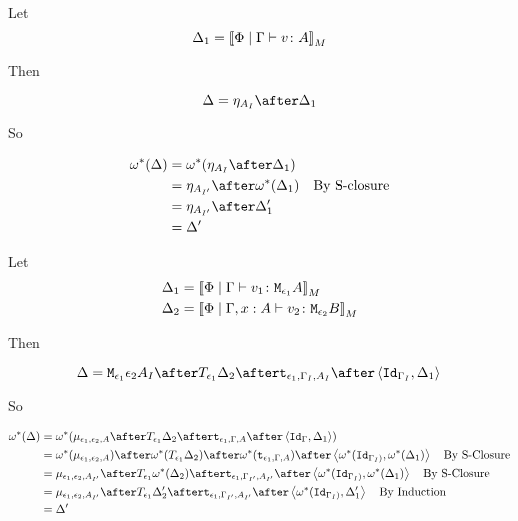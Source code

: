 \documentclass{report}
\begin{document}
Let \begin{equation}
    \Delta_1 = {\bf [\![}\Phi\mid\Gamma \vdash v \colon A{\bf ]\!]}_M
\end{equation}

Then

\begin{equation}
    \D = \point{A_I}\after \D_1\\
\end{equation}

So

\begin{align}
    \w\star(\D) &= \w\star(\point{A_I}\after \D_1)\\
            & = \point{A_{I'}} \after\w\star(\D_1)\qt{By S-closure}\\
            & = \point{A_{I'}} \after\D_1'\\
            & = \D'
\end{align}

Let \begin{align}
    \Delta_1 &= {\bf [\![}\Phi\mid\Gamma \vdash v_1 \colon \texttt{M}_{\epsilon_1}{A}{\bf ]\!]}_M\\
    \Delta_2 &= {\bf [\![}\Phi\mid\Gamma, x: A \vdash v_2 \colon \texttt{M}_{\epsilon_2}{B}{\bf ]\!]}_M
\end{align}

Then

\begin{equation}
    \D = \M{\e_1}{\e_2}{A_I}\after\T{\e_1}{\D_2}\after\tstrength{\e_1}{\G_I}{A_I}\after\pr{\Id{\G_{I}}}{\D_1}\\
\end{equation}

So

\begin{align}
    \w\star(\D) &= \w\star(\bind{\e_1}{\e_2}{A}\after\T{\e_1}{\D_2}\after\tstrength{\e_1}{\G}{A}\after\pr{\Id{\G}}{\D_1})\\
    & = \w\star(\bind{\e_1}{\e_2}{A})\after\w\star(\T{\e_1}{\D_2})\after\w\star(\tstrength{\e_1}{\G}{A})\after\pr{\w\star(\Id{\G_{I})}}{\w\star(\D_1)}\qt{By S-Closure}\\
    &= \bind{\e_1}{\e_2}{A_{I'}}\after\T{\e_1}{\w\star(\D_2)}\after\tstrength{\e_1}{\G_{I'}}{A_{I'}}\after\pr{\w\star(\Id{\G_{I})}}{\w\star(\D_1)}\qt{By S-Closure}\\
    &= \bind{\e_1}{\e_2}{A_{I'}}\after\T{\e_1}{\D_2'}\after\tstrength{\e_1}{\G_{I'}}{A_{I'}}\after\pr{\w\star(\Id{\G_{I})}}{\D_1'}\qt{By Induction}\\
    &= \D'\\
\end{align}
\end{document}
